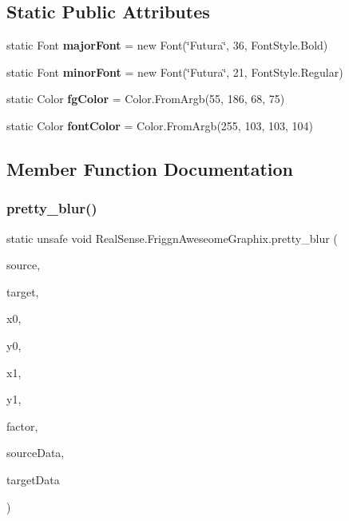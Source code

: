 \subsection*{Static Public Attributes}
\begin{DoxyCompactItemize}
\item 
\mbox{\label{class_real_sense_1_1_friggn_aweseome_graphix_ad34adf2179722fa8080e9f4032bc43ce}} 
static Font {\bfseries major\+Font} = new Font(\char`\"{}Futura\char`\"{}, 36, Font\+Style.\+Bold)
\item 
\mbox{\label{class_real_sense_1_1_friggn_aweseome_graphix_a9d2afacf158345fcecf1b25b895806a2}} 
static Font {\bfseries minor\+Font} = new Font(\char`\"{}Futura\char`\"{}, 21, Font\+Style.\+Regular)
\item 
\mbox{\label{class_real_sense_1_1_friggn_aweseome_graphix_a167341ae00dc0a13928b8b26de77e277}} 
static Color {\bfseries fg\+Color} = Color.\+From\+Argb(55, 186, 68, 75)
\item 
\mbox{\label{class_real_sense_1_1_friggn_aweseome_graphix_a80a40fcc2a193f1d3a2a7ba3d9d4eb2b}} 
static Color {\bfseries font\+Color} = Color.\+From\+Argb(255, 103, 103, 104)
\end{DoxyCompactItemize}


\subsection{Member Function Documentation}
\mbox{\label{class_real_sense_1_1_friggn_aweseome_graphix_aaa75438fcc2f1f738744e6fda161e82b}} 
\subsubsection{pretty\+\_\+blur()}
{\footnotesize\ttfamily static unsafe void Real\+Sense.\+Friggn\+Aweseome\+Graphix.\+pretty\+\_\+blur (\begin{DoxyParamCaption}\item[{Bitmap}]{source,  }\item[{Bitmap}]{target,  }\item[{int}]{x0,  }\item[{int}]{y0,  }\item[{int}]{x1,  }\item[{int}]{y1,  }\item[{int}]{factor,  }\item[{Bitmap\+Data}]{source\+Data,  }\item[{Bitmap\+Data}]{target\+Data }\end{DoxyParamCaption})\hspace{0.3cm}{\ttfamily [static]}}

